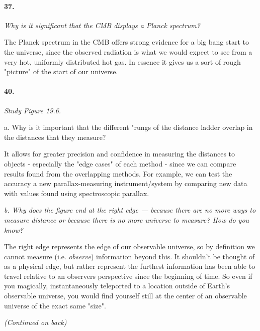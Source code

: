 \documentclass[letterpaper,11pt]{article}
\begin{document}
\paragraph{37.}
\it
Why is it significant that the CMB displays a Planck spectrum?
\smallskip
	\par
	\normalfont
	The Planck spectrum in the CMB offers strong evidence for a big bang start to the universe, since the observed radiation is what we would expect to see from a very hot, uniformly distributed hot gas. In essence it gives us a sort of rough "picture" of the start of our universe.



\paragraph{40.}
\it
Study Figure 19.6.
\smallskip
\par
a. Why is it important that the different "rungs of the distance ladder overlap in the distances that they measure?
\smallskip
	\par
	\normalfont
	It allows for greater precision and confidence in measuring the distances to objects - especially the "edge cases" of each method - since we can compare results found from the overlapping methods. For example, we can test the accuracy a new parallax-measuring instrument/system by comparing new data with values found using spectroscopic parallax.
	\par
	\bigskip
\par
\it
b. Why does the figure end at the right edge — because there are no more ways to measure distance or because there is no more universe to measure? How do you know?
\smallskip
	\par
	\normalfont
	The right edge represents the edge of our observable universe, so by definition we cannot measure (i.e. \textit{observe}) information beyond this. It shouldn't be thought of as a physical edge, but rather represent the furthest information has been able to travel relative to an observers perspective since the beginning of time. So even if you magically, instantaneously teleported to a location outside of Earth's observable universe, you would find yourself still at the center of an observable universe of the exact same "size".
	
	
	
\bigskip
\begin{center}
	\it
	(Continued on back)
\end{center}
\pagebreak
\end{document}
